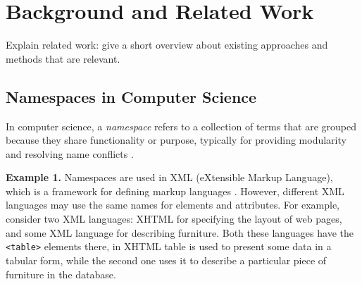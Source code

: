 \section{Background and Related Work}

Explain related work: give a short overview about existing 
approaches and methods that are relevant.







\subsection{Namespaces in Computer Science}

In computer science, a \emph{namespace} refers to a collection of terms
that are grouped because they share functionality or purpose,
typically for providing modularity
and resolving name conflicts \cite{duval2002metadata}.


\textbf{Example 1.} Namespaces are used in XML (eXtensible Markup Language), which
is a framework for defining markup languages \cite{moller2006introduction}.
However, different XML languages may use the same names for elements and attributes.
For example, consider two XML languages: XHTML for specifying the layout of web
pages, and some XML language for describing furniture. Both these languages have
the \verb|<table>| elements there, in XHTML table is used to present some data in
a tabular form, while the second one uses it to describe a particular piece of
furniture in the database.

